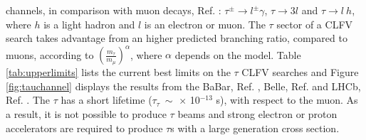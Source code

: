 channels, in comparison with muon decays, Ref. \cite{clfv_signorelli}: 
$\tau^\pm \rightarrow l^\pm \gamma$, $\tau \rightarrow 3l$ and $\tau\rightarrow l \ h$, 
where $h$ is a light hadron and $l$ is an electron or muon. The $\tau$ sector of a CLFV search takes advantage from an higher predicted branching ratio, compared to muons, 
according to $(\frac{m_\tau}{m_\mu})^\alpha$, where $\alpha$ depends on the model. Table \ref{tab:upperlimits} lists the current best limits on the $\tau$ 
CLFV searches and Figure \ref{fig:tauchannel} displays the results from the BaBar, Ref. \cite{PhysRevD.77.091104}, Belle, Ref. \cite{ABASHIAN2002117} and LHCb, 
Ref. \cite{TheLHCbCollaboration2008}. The $\tau$  has a short lifetime ($\tau_\tau \ \sim$  $\times$ 10$^{-13}$ s), with respect to the muon.
As a result, it is not possible to produce $\tau$ beams and
{\red strong electron or proton accelerators are required to produce $\tau$s with
  a large generation cross section. }

